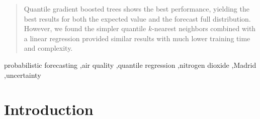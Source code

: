 \documentclass[a4paper,3p,sort&compress]{elsarticle}
\begin{document}
\begin{frontmatter}
\begin{abstract}
Quantile gradient boosted
trees shows the best performance, yielding the best results for both the
expected value and the forecast full distribution. However, we found 
the simpler quantile $k$-nearest neighbors 
combined with a linear regression provided similar results with much lower 
training time and complexity.



\end{abstract}

\begin{keyword}
probabilistic forecasting \sep air quality \sep quantile regression
\sep nitrogen dioxide \sep Madrid \sep uncertainty 
\end{keyword}

\end{frontmatter}


\section{Introduction }
\label{sec:intro}
\end{document}
